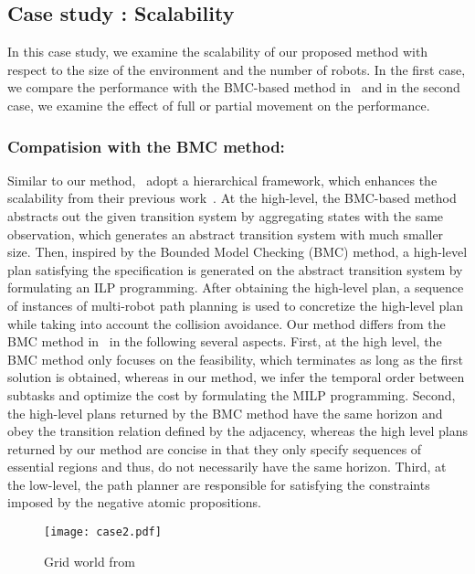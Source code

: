 \documentclass[Afour,sageh,times]{sagej}
\newcommand{\RNum}[1]{\uppercase\expandafter{\romannumeral #1\relax}}
\begin{document}
{\subsection{Case study \RNum{3}: Scalability}

In this case study, we examine the scalability of our proposed method with respect to the size of the environment and the number of robots. In the first case, we  compare the performance with the BMC-based method in~\cite{sahin2019multi} and in the second case, we examine the effect of full or partial  movement on the performance.


\subsubsection{Compatision with the BMC method:}
Similar to our method,~\cite{sahin2019multi} adopt a hierarchical framework, which enhances the scalability from their previous work~\cite{sahin2017synchronous,sahin2019multirobot}. At the high-level, the BMC-based method abstracts out the given transition system by aggregating states with the same observation, which generates an abstract transition system with much smaller size. Then, inspired by the Bounded Model Checking (BMC) method,  a high-level plan satisfying the specification is generated on the abstract transition system by formulating an ILP programming. After obtaining the high-level plan, a sequence of instances of  multi-robot path planning is used to concretize the high-level plan while taking into account the collision avoidance. Our method differs from the BMC method in~\cite{sahin2019multi} in the following several aspects. First, at the high level, the BMC method only focuses on the feasibility, which terminates as long as the first solution is obtained, whereas in our method, we infer the temporal order between subtasks and optimize the cost by formulating the MILP programming. Second, the high-level plans returned by the BMC method have the same horizon and obey the transition relation defined by the adjacency, whereas the high level plans returned by our method are concise in that they only specify sequences of essential regions and thus, do not necessarily have the same horizon. Third, at the low-level, the path planner are responsible for satisfying the constraints imposed by the negative atomic propositions.
 \begin{figure}[!t]
    \centering
    \texttt{[image: case2.pdf]}
    \caption{Grid world from~\cite{sahin2019multi}}\label{fig:scalability}
 \end{figure}


}
\end{document}
